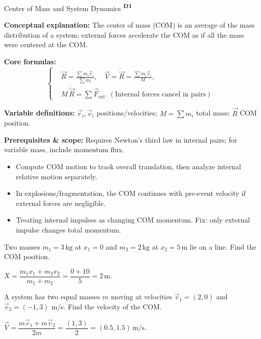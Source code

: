 ﻿\documentclass[12pt,a4paper]{article}
\providecommand{\KPFormulas}{}
\providecommand{\KPHeuristics}{}
\providecommand{\KPProblems}{}
\newcommand{\DOne}{\texorpdfstring{\textsuperscript{\textbf{D1}}}{ D1}}
\begin{document}
\begin{KnowledgePoint}{Center of Mass and System Dynamics \DOne}
  \KPFormulas
  \begin{formulabox}
  \textbf{Conceptual explanation:} The center of mass (COM) is an average of the mass distribution of a system; external forces accelerate the COM as if all the mass were centered at the COM.

  \textbf{Core formulas:}
  \[
  \left\{\begin{aligned}
    &\vec R=\frac{\sum m_i\vec r_i}{\sum m_i},\quad \vec V=\dot{\vec R}=\frac{\sum m_i\vec v_i}{M},\\
    &M\,\ddot{\vec R}=\sum \vec F_{\text{ext}}.\ (\text{Internal forces cancel in pairs})
  \end{aligned}\right.
  \]

  \textbf{Variable definitions:} $\vec r_i,\vec v_i$ positions/velocities; $M=\sum m_i$ total mass; $\vec R$ COM position.

  

  \textbf{Prerequisites \& scope:} Requires Newton's third law in internal pairs; for variable mass, include momentum flux.
  \end{formulabox}

  \KPHeuristics
  \begin{heuristicsbox}
  \begin{itemize}[leftmargin=*]
    \item Compute COM motion to track overall translation, then analyze internal relative motion separately.
    \item In explosions/fragmentation, the COM continues with pre-event velocity if external forces are negligible.
  \end{itemize}
  \vspace{0.4em}
  \begin{itemize}[leftmargin=*]
    \item Treating internal impulses as changing COM momentum. Fix: only external impulse changes total momentum.
  \end{itemize}
  \end{heuristicsbox}

  \KPProblems
\begin{cheatproblem}
  Two masses $m_1=3\,\text{kg}$ at $x_1=0$ and $m_2=2\,\text{kg}$ at $x_2=5\,\text{m}$ lie on a line. Find the COM position.
\begin{solutionbox}
  $X=\dfrac{m_1x_1+m_2x_2}{m_1+m_2}=\dfrac{0+10}{5}=2\,\text{m}$.
\end{solutionbox}
\end{cheatproblem}
\begin{cheatproblem}
  A system has two equal masses $m$ moving at velocities $\vec v_1=(2,0)$ and $\vec v_2=(-1,3)$ m/s. Find the velocity of the COM.
\begin{solutionbox}
  $\vec V=\dfrac{m\vec v_1+m\vec v_2}{2m}=\dfrac{(1,3)}{2}=(0.5,1.5)\,\text{m/s}$.
\end{solutionbox}
\end{cheatproblem}
\end{KnowledgePoint}
\end{document}
